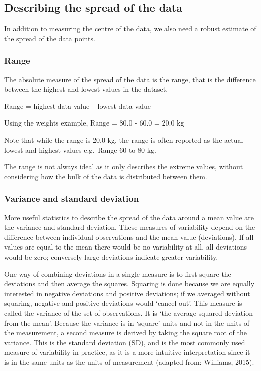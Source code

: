 \documentclass[
]{memoir}
\begin{document}
\hypertarget{describing-the-spread-of-the-data}{%
\subsection{Describing the spread of the data}\label{describing-the-spread-of-the-data}}

In addition to measuring the centre of the data, we also need a robust estimate of the spread of the data points.

\hypertarget{range}{%
\subsubsection{Range}\label{range}}

The absolute measure of the spread of the data is the range, that is the difference between the highest and lowest values in the dataset.

Range = highest data value -- lowest data value

Using the weights example, Range = 80.0 - 60.0 = 20.0 kg

Note that while the range is 20.0 kg, the range is often reported as the actual lowest and highest values e.g.~Range 60 to 80 kg.

The range is not always ideal as it only describes the extreme values, without considering how the bulk of the data is distributed between them.

\hypertarget{variance-and-standard-deviation}{%
\subsubsection{Variance and standard deviation}\label{variance-and-standard-deviation}}

More useful statistics to describe the spread of the data around a mean value are the variance and standard deviation. These measures of variability depend on the difference between individual observations and the mean value (deviations). If all values are equal to the mean there would be no variability at all, all deviations would be zero; conversely large deviations indicate greater variability.

One way of combining deviations in a single measure is to first square the deviations and then average the squares. Squaring is done because we are equally interested in negative deviations and positive deviations; if we averaged without squaring, negative and positive deviations would `cancel out'. This measure is called the variance of the set of observations. It is `the average squared deviation from the mean'. Because the variance is in `square' units and not in the units of the measurement, a second measure is derived by taking the square root of the variance. This is the standard deviation (SD), and is the most commonly used measure of variability in practice, as it is a more intuitive interpretation since it is in the same units as the units of measurement (adapted from: Williams, 2015).
\end{document}
